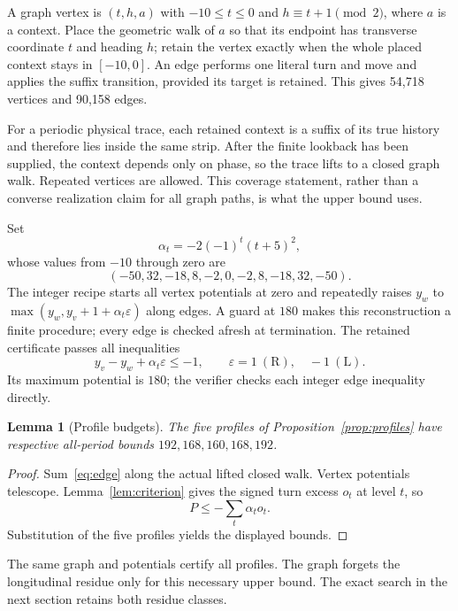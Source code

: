 \documentclass[11pt]{article}
\newtheorem{lemma}[theorem]{Lemma}
\theoremstyle{definition}\newtheorem{definition}[theorem]{Definition}
\newcommand{\Rr}{\mathrm R}
\newcommand{\Ll}{\mathrm L}
\begin{document}
A graph vertex is $(t,h,a)$ with $-10\le t\le0$ and
$h\equiv t+1\pmod2$, where $a$ is a context. Place the geometric walk of
$a$ so that its endpoint has transverse coordinate $t$ and heading $h$;
retain the vertex exactly when the whole placed context stays in $[-10,0]$.
An edge performs one literal turn and move and applies the suffix transition,
provided its target is retained. This gives 54,718 vertices and 90,158 edges.

For a periodic physical trace, each retained context is a suffix of its true
history and therefore lies inside the same strip. After the finite lookback
has been supplied, the context depends only on phase, so the trace lifts to
a closed graph walk. Repeated vertices are allowed. This coverage statement,
rather than a converse realization claim for all graph paths, is what the
upper bound uses.

Set
\begin{equation}\label{eq:alpha}
\alpha_t=-2(-1)^t(t+5)^2,
\end{equation}
whose values from $-10$ through zero are
\[
(-50,32,-18,8,-2,0,-2,8,-18,32,-50).
\]
The integer recipe starts all vertex potentials at zero and repeatedly raises
$y_w$ to $\max(y_w,y_v+1+\alpha_t\varepsilon)$ along edges. A guard at $180$
makes this reconstruction a finite procedure; every edge is checked afresh
at termination. The retained certificate passes all inequalities
\begin{equation}\label{eq:edge}
y_v-y_w+\alpha_t\varepsilon\le-1,
\qquad \varepsilon=1\ (\Rr),\quad -1\ (\Ll).
\end{equation}
Its maximum potential is $180$; the verifier checks each integer edge
inequality directly.

\begin{lemma}[Profile budgets]\label{lem:budget}
The five profiles of Proposition~\ref{prop:profiles} have respective all-period
bounds $192,168,160,168,192$.
\end{lemma}
\begin{proof}
Sum~\eqref{eq:edge} along the actual lifted closed walk. Vertex potentials
telescope. Lemma~\ref{lem:criterion} gives the signed turn excess $o_t$ at
level $t$, so
\[
P\le-\sum_t\alpha_t o_t.
\]
Substitution of the five profiles yields the displayed bounds.
\end{proof}

The same graph and potentials certify all profiles. The graph forgets the
longitudinal residue only for this necessary upper bound. The exact search
in the next section retains both residue classes.
\end{document}
